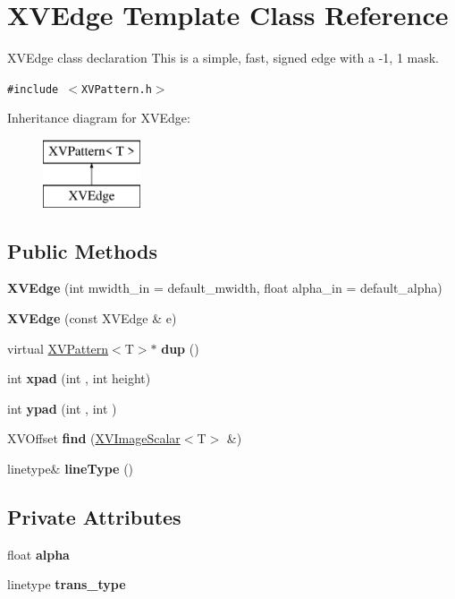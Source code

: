 \hypertarget{class_XVEdge}{
\section{XVEdge  Template Class Reference}
\label{XVEdge}
}
XVEdge class declaration This is a simple, fast, signed edge with a -1, 1 mask. 


{\tt \#include $<$XVPattern.h$>$}

Inheritance diagram for XVEdge:\begin{figure}[H]
\begin{center}
\leavevmode
\includegraphics[height=2cm]{class_XVEdge}
\end{center}
\end{figure}
\subsection*{Public Methods}
\begin{CompactItemize}
\item 
{\bf XVEdge} (int mwidth\_\-in = default\_\-mwidth, float alpha\_\-in = default\_\-alpha)
\item 
{\bf XVEdge} (const XVEdge \& e)
\item 
virtual \hyperlink{class_XVPattern}{XVPattern}$<$T$>$$\ast$ {\bf dup} ()
\item 
int {\bf xpad} (int , int height)
\item 
int {\bf ypad} (int , int )
\item 
\label{XVEdge_a5}
\hypertarget{class_XVEdge_a5}{
XVOffset {\bf find} (\hyperlink{class_XVImageScalar}{XVImage\-Scalar}$<$T$>$ \&)}

\item 
linetype\& {\bf line\-Type} ()
\end{CompactItemize}
\subsection*{Private Attributes}
\begin{CompactItemize}
\item 
float {\bf alpha}
\item 
linetype {\bf trans\_\-type}
\end{CompactItemize}


